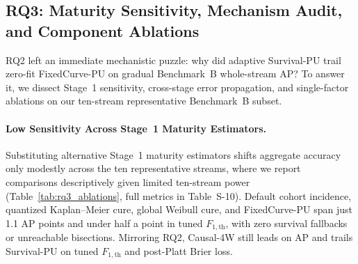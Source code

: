 \documentclass[pdflatex,sn-basic]{sn-jnl}
\theoremstyle{definition}
\theoremstyle{plain}
\begin{document}
\subsection{RQ3: Maturity Sensitivity, Mechanism Audit, and Component Ablations}
\label{sec:rq3}

RQ2 left an immediate mechanistic puzzle: why did adaptive Survival-PU trail zero-fit FixedCurve-PU on gradual Benchmark~B whole-stream AP? To answer it, we dissect Stage~1 sensitivity, cross-stage error propagation, and single-factor ablations on our ten-stream representative Benchmark~B subset.

\paragraph{Low Sensitivity Across Stage~1 Maturity Estimators.}
Substituting alternative Stage~1 maturity estimators shifts aggregate accuracy only modestly across the ten representative streams, where we report comparisons descriptively given limited ten-stream power (Table~\ref{tab:rq3_ablations}, full metrics in Table~S-10). Default cohort incidence, quantized Kaplan--Meier cure, global Weibull cure, and FixedCurve-PU span just 1.1 AP points and under half a point in tuned $F_{1,\text{th}}$, with zero survival fallbacks or unreachable bisections. Mirroring RQ2, Causal-4W still leads on AP and trails Survival-PU on tuned $F_{1,\text{th}}$ and post-Platt Brier loss.
\end{document}
